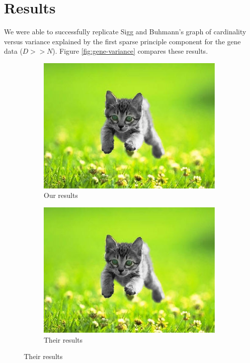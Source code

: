 \documentclass[twocolumn]{article}
\begin{document}
\section{Results}

We were able to successfully replicate Sigg and Buhmann's graph of
cardinality versus variance explained by the first sparse
principle component for the gene data ($D >> N$).
Figure \ref{fig:gene-variance} compares these results.

\begin{figure}[H,width=\textwidth]
\caption{Variance versus cardinality for gene data}
\label{fig:gene-variance}
\begin{subfigure}{0.5\textwidth}
\caption{Our results}
\includegraphics[width=\textwidth]{kitten.jpg}
\end{subfigure}
\begin{subfigure}{0.5\textwidth}
\caption{Their results}
\includegraphics[width=\textwidth]{kitten.jpg}
\end{subfigure}
\end{figure}
\end{document}
